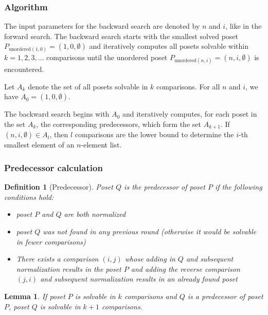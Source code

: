 \documentclass[10pt,journal,compsoc]{IEEEtran}
\newtheorem{lemma}{Lemma}
\newtheorem{definition}{Definition}
\begin{document}
\subsubsection{Algorithm} \label{sec:backward:algorithm}
The input parameters for the backward search are denoted by $n$ and $i$, like in the forward search.
The backward search starts with the smallest solved poset $P_{\text{unordered} (1, 0)} = (1, 0, \emptyset)$ and iteratively computes all posets solvable within $k = 1, 2, 3, \dots$ comparisons until the unordered poset $P_{\text{unordered} (n, i)} = (n, i, \emptyset)$ is encountered.

Let $A_k$ denote the set of all posets solvable in $k$ comparisons.
For all $n$ and $i$, we have $A_0 = { (1, 0, \emptyset) }$.

The backward search begins with $A_0$ and iteratively computes, for each poset in the set $A_k$, the corresponding predecessors, which form the set $A_{k + 1}$.
If $(n, i, \emptyset) \in A_l$, then $l$ comparisons are the lower bound to determine the $i$-th smallest element of an $n$-element list.


\subsubsection{Predecessor calculation} \label{sec:backward:predecessor_calculation}

\begin{definition}[Predecessor] \label{definition:predecessor_calculation}
  Poset $Q$ is the predecessor of poset $P$ if the following conditions hold:
  \begin{itemize}
    \item poset $P$ and $Q$ are both normalized
    \item poset $Q$ was not found in any previous round (otherwise it would be solvable in fewer comparisons)
    \item There exists a comparison $(i, j)$ whose adding in $Q$ and subsequent normalization results in the poset $P$ and adding the reverse comparison $(j, i)$ and subsequent normalization results in an already found poset
  \end{itemize}
\end{definition}

\begin{lemma} \label{lemma:predecessor_calculation}
  If poset $P$ is solvable in $k$ comparisons and $Q$ is a predecessor of poset $P$, poset $Q$ is solvable in $k + 1$ comparisons.
\end{lemma}
\end{document}
